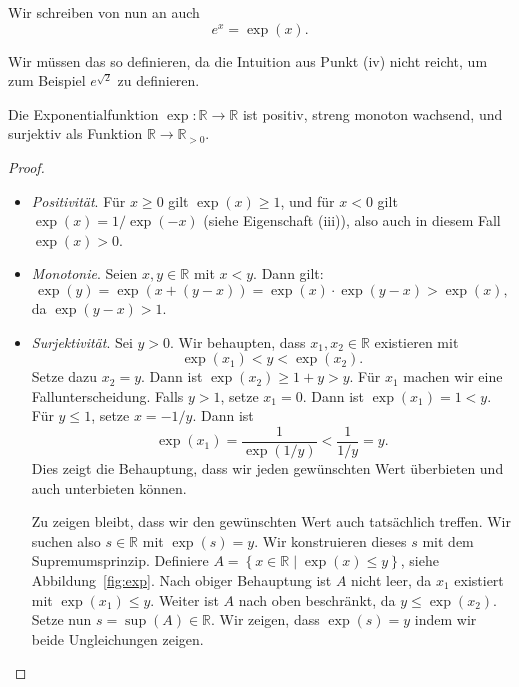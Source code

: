 \documentclass[../main.tex]{subfiles}
\begin{document}
\begin{notation}
  Wir schreiben von nun an auch
  \[
    e^x = \exp(x).
  \]
\end{notation}

Wir müssen das so 
definieren, da die Intuition aus
Punkt (iv) nicht reicht, um zum Beispiel
$e^{\sqrt 2}$ zu definieren.

\begin{proposition*}
  Die Exponentialfunktion $\exp \colon \mathbb{R} \to \mathbb{R}$ 
  ist positiv, streng monoton wachsend, und surjektiv
  als Funktion $\mathbb{R} \to \mathbb{R}_{>0}$.
\end{proposition*}

\begin{proof}
  \leavevmode
  \begin{itemize}
    \item \emph{Positivität}. 
      Für $x \geq 0$ gilt $\exp(x) \geq 1$,
      und für $x < 0 $ gilt $\exp(x) = 1/\exp(-x)$
      (siehe Eigenschaft (iii)), also
      auch in diesem Fall
      $\exp(x) > 0$.
    \item \emph{Monotonie}. 
      Seien $x, y \in \mathbb{R}$ mit $x < y$.
      Dann gilt:
      \[
        \exp(y) = \exp(x + (y - x))
        = \exp(x) \cdot \exp(y-x)
        > \exp(x),
      \]
      da $\exp(y-x) > 1$.
    \item \emph{Surjektivität}.
      Sei $y > 0$. Wir behaupten,
      dass $x_1, x_2 \in \mathbb{R}$ existieren mit 
      \[
        \exp(x_1) < y < \exp(x_2).
      \]
      Setze dazu $x_2 = y$. Dann ist
        $\exp(x_2) \geq 1 + y > y$.
      Für $x_1$ machen wir eine Fallunterscheidung.
      Falls $y > 1$, setze $x_1 = 0$. Dann ist
      $\exp(x_1) = 1 < y$. Für $y \leq 1$, setze
      $x = -1/y$. Dann ist
       \[
         \exp(x_1) = \frac{1}{\exp(1/y)} < \frac{1}{1/y} = y.
      \]
      Dies zeigt die Behauptung, dass wir jeden gewünschten
      Wert überbieten und auch unterbieten können.

      Zu zeigen bleibt, dass wir den gewünschten Wert auch
      tatsächlich treffen.
      Wir suchen also $s \in \mathbb{R}$ mit $\exp(s) = y$.
      Wir konstruieren dieses $s$ mit dem Supremumsprinzip.
      Definiere
      $A = \left\{x \in \mathbb{R} \mid \exp(x) \leq y\right\}$,
      siehe Abbildung~\ref{fig:exp}.
      Nach obiger Behauptung ist $A$ nicht leer,
      da $x_1$ existiert mit $\exp(x_1) \leq y$.
      Weiter ist $A$ nach oben beschränkt,
      da $y \leq \exp(x_2)$.
      Setze nun $s = \sup(A) \in \mathbb{R}$.
      Wir zeigen, dass $\exp(s) = y$ indem wir
      beide Ungleichungen zeigen.


\end{itemize}
\end{proof}
\end{document}
